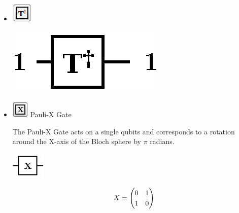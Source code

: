 \documentclass[10pt]{article}
\theoremstyle{definition}
\begin{document}
\begin{itemize}
\item \includegraphics{Figures/Gates/TAdjointGate.png} 

\begin{center}
\includegraphics[scale=.7]{Figures/Gates/TAdjointGateViewer} \\
\end{center}

\item \includegraphics{Figures/Gates/XGate.png}  Pauli-X Gate

The Pauli-X Gate acts on a single qubits and corresponds to a rotation around the X-axis of the Bloch sphere by $\pi$ radians.

\begin{center}
\includegraphics[scale=.7]{Figures/Gates/XGateViewer} \\
  \begin{minipage}{.9\linewidth}
    \begin{equation*} \label{mat:XGate}
    \renewcommand{\arraystretch}{1.25}
X = \begin{pmatrix} 0 & 1 \\ 1 & 0 \end{pmatrix}
    \end{equation*}
  \end{minipage}\hspace{-2.5cm}
  \begin{minipage}{.2\linewidth}
  \vspace*{3pt}
    \begin{align}
    \end{align}
  \end{minipage}
\end{center}


\end{itemize}
\end{document}
